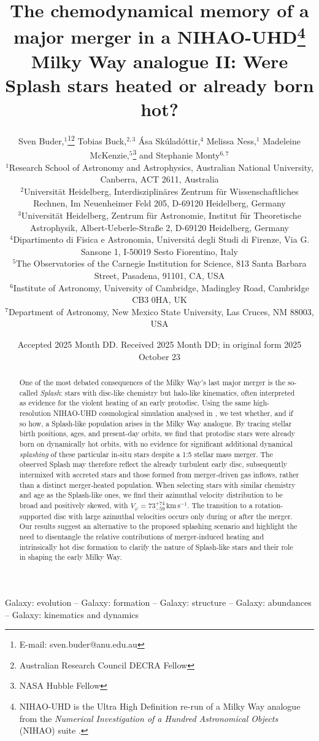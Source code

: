\documentclass[fleqn,usenatbib]{mnras}
\title[Were Splash stars heated or already born hot?]{The chemodynamical memory of a major merger in a NIHAO-UHD\thanks{NIHAO-UHD is the Ultra High Definition re-run of a Milky Way analogue from the \textit{Numerical Investigation of a Hundred Astronomical Objects} (NIHAO) suite \citep{Wang2015}.} Milky Way analogue II: Were Splash stars heated or already born hot?}
\author[S. Buder et al.]{Sven Buder,$^{1}$\thanks{E-mail: sven.buder@anu.edu.au}\thanks{Australian Research Council DECRA Fellow}\orcidlink{0000-0002-4031-8553}
Tobias Buck,$^{2,3}$\orcidlink{0000-0003-2027-399X}
Ása Skúladóttir,$^{4}$\orcidlink{0000-0001-9155-9018}
Melissa Ness,$^{1}$\orcidlink{0000-0001-5082-6693}
Madeleine McKenzie,$^{5}$\thanks{NASA Hubble Fellow}\orcidlink{0000-0002-1715-1257}
and\newauthor
Stephanie Monty$^{6, 7}$\orcidlink{0000-0002-9225-5822}
\\
$^{1}$Research School of Astronomy and Astrophysics, Australian National University, Canberra, ACT 2611, Australia\\
$^{2}$Universit{\"a}t Heidelberg, Interdisziplin{\"a}res Zentrum f{\"u}r Wissenschaftliches Rechnen, Im Neuenheimer Feld 205, D-69120 Heidelberg, Germany\\
$^{3}$Universit{\"a}t Heidelberg, Zentrum f{\"u}r Astronomie, Institut f{\"u}r Theoretische Astrophysik, Albert-Ueberle-Straße 2, D-69120 Heidelberg, Germany\\
$^{4}$Dipartimento di Fisica e Astronomia, Universitá degli Studi di Firenze, Via G. Sansone 1, I-50019 Sesto Fiorentino, Italy\\
$^{5}$The Observatories of the Carnegie Institution for Science, 813 Santa Barbara Street, Pasadena, 91101, CA, USA\\
$^{6}$Institute of Astronomy, University of Cambridge, Madingley Road, Cambridge CB3 0HA, UK\\
$^{7}$Department of Astronomy, New Mexico State University, Las Cruces, NM 88003, USA
}
\date{Accepted 2025 Month DD. Received 2025 Month DD; in original form 2025 October 23}
\begin{document}
\label{firstpage}
\pagerange{\pageref{firstpage}--\pageref{lastpage}}
\maketitle

\begin{abstract} %
One of the most debated consequences of the Milky Way's last major merger is the so-called \textit{Splash}: stars with disc-like chemistry but halo-like kinematics, often interpreted as evidence for the violent heating of an early protodisc. Using the same high-resolution NIHAO-UHD cosmological simulation analysed in \citet[][hereafter ]{Buder2025c}, we test whether, and if so how, a Splash-like population arises in the Milky Way analogue. By tracing stellar birth positions, ages, and present-day orbits, we find that protodisc stars were already born on dynamically hot orbits, with no evidence for significant additional dynamical \textit{splashing} of these particular in-situ stars despite a 1:5 stellar mass merger. The observed Splash may therefore reflect the already turbulent early disc, subsequently intermixed with accreted stars and those formed from merger-driven gas inflows, rather than a distinct merger-heated population. When selecting stars with similar chemistry and age as the Splash-like ones, we find their azimuthal velocity distribution to be broad and positively skewed, with $V_\varphi = 73_{-59}^{+74}\,\mathrm{km\,s^{-1}}$. The transition to a rotation-supported disc with large azimuthal velocities occurs only during or after the merger. Our results suggest an alternative to the proposed splashing scenario and highlight the need to disentangle the relative contributions of merger-induced heating and intrinsically hot disc formation to clarify the nature of Splash-like stars and their role in shaping the early Milky Way.
\end{abstract}

\begin{keywords}
Galaxy: evolution -- Galaxy: formation -- Galaxy: structure -- Galaxy: abundances -- Galaxy: kinematics and dynamics
\end{keywords}


\end{document}
